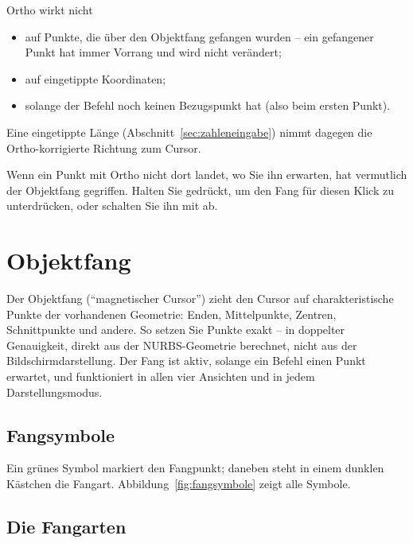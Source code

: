 Ortho wirkt nicht
\begin{itemize}
\item auf Punkte, die über den Objektfang gefangen wurden -- ein gefangener Punkt hat immer
  Vorrang und wird nicht verändert;
\item auf eingetippte Koordinaten;
\item solange der Befehl noch keinen Bezugspunkt hat (also beim ersten Punkt).
\end{itemize}
Eine eingetippte Länge (Abschnitt~\ref{sec:zahleneingabe}) nimmt dagegen die Ortho-korrigierte
Richtung zum Cursor.

\begin{tipp}
Wenn ein Punkt mit Ortho nicht dort landet, wo Sie ihn erwarten, hat vermutlich der Objektfang
gegriffen. Halten Sie  gedrückt, um den Fang für diesen Klick zu unterdrücken, oder
schalten Sie ihn mit  ab.
\end{tipp}

\section{Objektfang}\label{sec:objektfang}

Der Objektfang (\enquote{magnetischer Cursor}) zieht den Cursor auf charakteristische Punkte
der vorhandenen Geometrie: Enden, Mittelpunkte, Zentren, Schnittpunkte und andere. So setzen Sie
Punkte exakt -- in doppelter Genauigkeit, direkt aus der NURBS-Geometrie berechnet, nicht aus der
Bildschirmdarstellung. Der Fang ist aktiv, solange ein Befehl einen Punkt erwartet, und
funktioniert in allen vier Ansichten und in jedem Darstellungsmodus.

\subsection{Fangsymbole}

Ein grünes Symbol markiert den Fangpunkt; daneben steht in einem dunklen Kästchen die Fangart.
Abbildung~\ref{fig:fangsymbole} zeigt alle Symbole.


\subsection{Die Fangarten}

